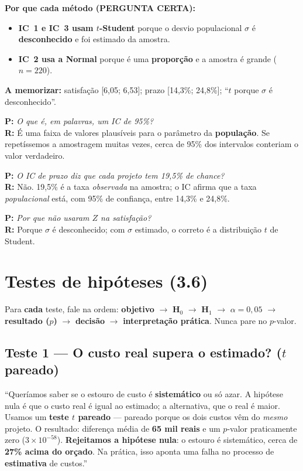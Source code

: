 \documentclass[a4paper, 11pt]{article}
\newcommand{\pergunta}[2]{\par\smallskip\noindent\textbf{P:} \emph{#1}\\
  \textbf{R:} #2}
\begin{document}
\textbf{Por que cada método (PERGUNTA CERTA):}
\begin{itemize}[noitemsep]
	\item \textbf{IC~1 e IC~3 usam $t$-Student} porque o desvio populacional $\sigma$ é
	      \textbf{desconhecido} e foi estimado da amostra.
	\item \textbf{IC~2 usa a Normal} porque é uma \textbf{proporção} e a amostra é grande ($n=220$).
\end{itemize}

\textbf{A memorizar:} satisfação [6,05; 6,53]; prazo [14,3\%; 24,8\%]; ``$t$ porque $\sigma$ é desconhecido''.

\pergunta{O que é, em palavras, um IC de 95\%?}{É uma faixa de valores plausíveis para o parâmetro da \textbf{população}. Se repetíssemos a amostragem muitas vezes, cerca de 95\% dos intervalos conteriam o valor verdadeiro.}
\pergunta{O IC de prazo diz que cada projeto tem 19,5\% de chance?}{Não. 19,5\% é a taxa \emph{observada} na amostra; o IC afirma que a taxa \emph{populacional} está, com 95\% de confiança, entre 14,3\% e 24,8\%.}
\pergunta{Por que não usaram $Z$ na satisfação?}{Porque $\sigma$ é desconhecido; com $\sigma$ estimado, o correto é a distribuição $t$ de Student.}

\section{Testes de hipóteses (3.6)}

\begin{fala}
Para \textbf{cada} teste, fale na ordem: \textbf{objetivo} $\to$ \textbf{H$_0$} $\to$
\textbf{H$_1$} $\to$ \textbf{$\alpha=0{,}05$} $\to$ \textbf{resultado ($p$)} $\to$
\textbf{decisão} $\to$ \textbf{interpretação prática}. Nunca pare no $p$-valor.
\end{fala}

\subsection{Teste 1 --- O custo real supera o estimado? ($t$ pareado)}
\begin{roteiro}
``Queríamos saber se o estouro de custo é \textbf{sistemático} ou só azar. A hipótese nula é que
o custo real é igual ao estimado; a alternativa, que o real é maior. Usamos um \textbf{teste $t$
pareado} --- pareado porque os dois custos vêm do \emph{mesmo} projeto. O resultado: diferença
média de \textbf{65 mil reais} e um $p$-valor praticamente zero (\textbf{$3\times10^{-58}$}).
\textbf{Rejeitamos a hipótese nula}: o estouro é sistemático, cerca de \textbf{27\% acima do
orçado}. Na prática, isso aponta uma falha no processo de \textbf{estimativa} de custos.''
\end{roteiro}
\end{document}
